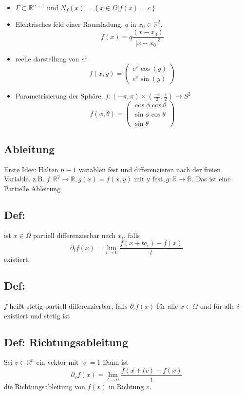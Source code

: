 \begin{itemize}
	\item $\Gamma \subset \mathbb R^{n+1}$ und $N_f(x) =\left\{x\in\Omega|f(x) = c\right\}$
	\item Elektrisches feld einer Raumladung. $q$ in $x_0\in\mathbb R^2$.
		$$
		f(x) = q\frac{(x-x_0)}{|x-x_0|^3}
		$$
	\item reelle darstellung von $e^z$
		\begin{equation}
			f(x,y) = 
			\begin{pmatrix}
				e^x\cos(y)\\
				e^x\sin(y)
			\end{pmatrix}
		\end{equation}
	\item Parametrisierung der Sphäre. $f:(-\pi,\pi)\times(\frac{-\pi}{2},\frac{\pi}{2})\rightarrow S^2$
		$$
		f(\phi,\theta)=
		\begin{pmatrix}
			\cos\phi\cos\theta\\
			\sin\phi\cos\theta\\
			\sin\theta
		\end{pmatrix}
		$$
\end{itemize}

\subsection{Ableitung}
Erste Idee: Halten $n-1$ variablen fest und differenzieren nach der freien Variable. z.B.
$f:\mathbb R^2 \rightarrow \mathbb R, g(x) = f(x,y)\text{ mit y fest}, g:\mathbb R \rightarrow \mathbb R$.
Das ist eine Partielle Ableitung
\subsection{Def: }
ist $x\in\Omega$ partiell differenzierbar nach $x_i$, falls
\begin{equation}
	\partial_i f(x) = \lim_{t\rightarrow 0}\frac{f(x+te_i) -f(x)}{t}
\end{equation}
existiert.

\subsection{Def: }
$f$ heißt stetig partiell differenzierbar, falls $\partial_i f(x)$ für alle $x\in\Omega$ und für alle $i$ existiert und stetig ist

\subsection{Def: Richtungsableitung}
Sei $v\in\mathbb R^n$ ein vektor mit $|v| = 1$ Dann ist
\begin{equation}
	\partial_v f(x) = \lim_{t\rightarrow 0} \frac{f(x+tv) - f(x)}{t}
\end{equation}
die Richtungsableitung von $f(x)$ in Richtung $v$.

